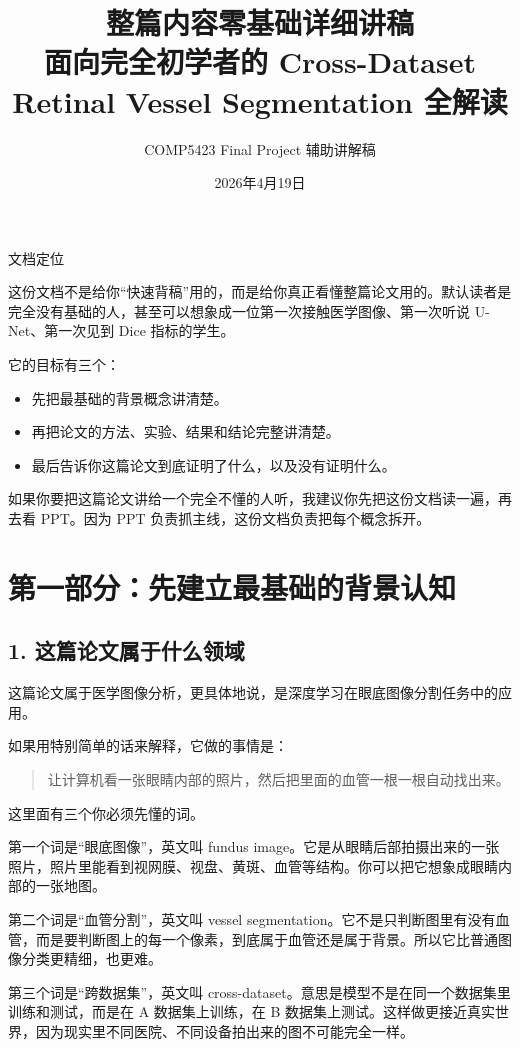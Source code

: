 \documentclass[12pt,a4paper]{ctexart}
\title{整篇内容零基础详细讲稿\\[4pt]
\large 面向完全初学者的 Cross-Dataset Retinal Vessel Segmentation 全解读}
\author{COMP5423 Final Project 辅助讲解稿}
\date{2026年4月19日}
\begin{document}
\maketitle

{\large\color{TitleBlue}文档定位}

这份文档不是给你“快速背稿”用的，而是给你真正看懂整篇论文用的。默认读者是完全没有基础的人，甚至可以想象成一位第一次接触医学图像、第一次听说 U-Net、第一次见到 Dice 指标的学生。

它的目标有三个：

\begin{itemize}[leftmargin=1.6em]
  \item 先把最基础的背景概念讲清楚。
  \item 再把论文的方法、实验、结果和结论完整讲清楚。
  \item 最后告诉你这篇论文到底证明了什么，以及没有证明什么。
\end{itemize}

如果你要把这篇论文讲给一个完全不懂的人听，我建议你先把这份文档读一遍，再去看 PPT。因为 PPT 负责抓主线，这份文档负责把每个概念拆开。

\section*{第一部分：先建立最基础的背景认知}

\subsection*{1. 这篇论文属于什么领域}

这篇论文属于医学图像分析，更具体地说，是深度学习在眼底图像分割任务中的应用。

如果用特别简单的话来解释，它做的事情是：

\begin{quote}
让计算机看一张眼睛内部的照片，然后把里面的血管一根一根自动找出来。
\end{quote}

这里面有三个你必须先懂的词。

第一个词是“眼底图像”，英文叫 fundus image。它是从眼睛后部拍摄出来的一张照片，照片里能看到视网膜、视盘、黄斑、血管等结构。你可以把它想象成眼睛内部的一张地图。

第二个词是“血管分割”，英文叫 vessel segmentation。它不是只判断图里有没有血管，而是要判断图上的每一个像素，到底属于血管还是属于背景。所以它比普通图像分类更精细，也更难。

第三个词是“跨数据集”，英文叫 cross-dataset。意思是模型不是在同一个数据集里训练和测试，而是在 A 数据集上训练，在 B 数据集上测试。这样做更接近真实世界，因为现实里不同医院、不同设备拍出来的图不可能完全一样。
\end{document}
